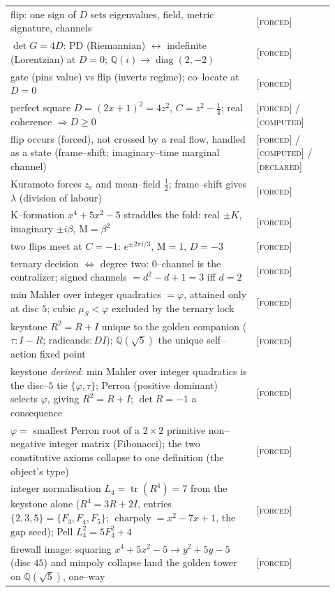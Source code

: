 \documentclass[11pt]{article}
\theoremstyle{plain}
\theoremstyle{definition}
\theoremstyle{remark}
\newcommand{\forced}{\textcolor{forcedc}{\textsc{[forced]}}}
\newcommand{\declared}{\textcolor{declaredc}{\textsc{[declared]}}}
\newcommand{\computed}{\textcolor{forcedc}{\textsc{[computed]}}}
\newcommand{\Q}{\mathbb{Q}}
\newcommand{\Mah}{\mathrm{M}}
\begin{document}
\begin{center}
\begin{tabular}{@{}p{0.70\linewidth}>{\raggedright\arraybackslash}p{0.22\linewidth}@{}}
flip: one sign of $D$ sets eigenvalues, field, metric signature, channels & \forced \\
$\det G=4D$: PD (Riemannian) $\leftrightarrow$ indefinite (Lorentzian) at $D=0$; $\Q(i)\to\operatorname{diag}(2,-2)$ & \forced \\
gate (pins value) vs flip (inverts regime); co--locate at $D=0$ & \forced \\
perfect square $D=(2x+1)^2=4z^2$, $C=z^2-\tfrac14$; real coherence $\Rightarrow D\ge0$ & \forced{} / \computed \\
flip occurs (forced), not crossed by a real flow, handled as a state (frame--shift; imaginary--time marginal channel) & \forced{} / \computed{} / \declared \\
Kuramoto forces $z_c$ and mean--field $\tfrac12$; frame--shift gives $\lambda$ (division of labour) & \forced \\
K--formation $x^4+5x^2-5$ straddles the fold: real $\pm K$, imaginary $\pm i\beta$, $\Mah=\beta^2$ & \forced \\
two flips meet at $C=-1$: $e^{\pm2\pi i/3}$, $\Mah=1$, $D=-3$ & \forced \\
ternary decision $\Leftrightarrow$ degree two: $0$--channel is the centralizer; signed channels $=d^2{-}d{+}1=3$ iff $d=2$ & \forced \\
min Mahler over integer quadratics $=\varphi$, attained only at disc $5$; cubic $\mu_S<\varphi$ excluded by the ternary lock & \forced \\
keystone $R^2=R+I$ unique to the golden companion ($\tau\!:I{-}R$; radicands$\!:DI$); $\Q(\sqrt5)$ the unique self--action fixed point & \forced \\
keystone \emph{derived}: min Mahler over integer quadratics is the disc--$5$ tie $\{\varphi,\tau\}$; Perron (positive dominant) selects $\varphi$, giving $R^2=R+I$; $\det R=-1$ a consequence & \forced \\
$\varphi=$ smallest Perron root of a $2\times2$ primitive non--negative integer matrix (Fibonacci); the two constitutive axioms collapse to one definition (the object's type) & \forced \\
integer normalisation $L_4=\operatorname{tr}(R^4)=7$ from the keystone alone ($R^4=3R{+}2I$, entries $\{2,3,5\}=\{F_3,F_4,F_5\}$; $\operatorname{charpoly}=x^2{-}7x{+}1$, the $\mathrm{gap}$ seed); Pell $L_4^2{=}5F_4^2{+}4$ & \forced \\
firewall image: squaring $x^4{+}5x^2{-}5\to y^2{+}5y{-}5$ (disc $45$) and minpoly collapse land the golden tower on $\Q(\sqrt5)$, one--way & \forced \\

\end{tabular}
\end{center}
\end{document}
